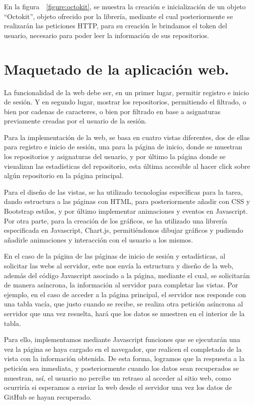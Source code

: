 En la figura~~\ref{figure:octokit}, se muestra la creación e inicialización de un objeto “Octokit”, objeto ofrecido por la librería, mediante el cual posteriormente se realizarán las peticiones HTTP, para su creación le brindamos el token del usuario, necesario para poder leer la información de sus repositorios. 



\section{Maquetado de la aplicación web.}

La funcionalidad de la web debe ser, en un primer lugar, permitir registro e inicio de sesión. Y en segundo lugar, mostrar los repositorios, permitiendo el filtrado, o bien por cadenas de caracteres, o bien por filtrado en base a asignaturas previamente creadas por el usuario de la sesión.

Para la implementación de la web, se basa en cuatro vistas diferentes, dos de ellas para registro e inicio de sesión, una para la página de inicio, donde se muestran los repositorios y asignaturas del usuario, y por último la página donde se visualizan las estadísticas del repositorio, esta última accesible al hacer click sobre algún repositorio en la página principal.

Para el diseño de las vistas, se ha utilizado tecnologías específicas para la tarea, dando estructura a las páginas con HTML, para posteriormente añadir con CSS\cite{GradienteCSS} y Bootstrap\cite{Bootstrap} estilos, y por último implementar animaciones y eventos en Javascript. Por otra parte, para la creación de los gráficos, se ha utilizado una librería especificada en Javascript, Chart.js\cite{ChartJS,ChartJSIntro}, permitiéndonos dibujar gráficos y pudiendo añadirle animaciones y interacción con el usuario a los mismos.

En el caso de la página de las páginas de inicio de sesión y estadísticas, al solicitar las webs al servidor, este nos envía la estructura y diseño de la web, además del código Javascript asociado a la página,  mediante el cual, se solicitarán de manera asíncrona, la información al servidor para completar las vistas. Por ejemplo, en el caso de acceder a la página principal, el servidor nos responde con una tabla vacía, que justo cuando se recibe, se realiza otra petición asíncrona al servidor que una vez resuelta, hará que los datos se muestren en el interior de la tabla. 

Para ello, implementamos mediante Javascript funciones que se ejecutarán una vez la página se haya cargado en el navegador, que realicen el completado de la vista con la información obtenida. De esta forma, logramos que la respuesta a la petición sea inmediata, y posteriormente cuando los datos sean recuperados se muestran, así, el usuario no percibe un retraso al acceder al sitio web, como ocurriría si esperamos a enviar la web desde el servidor una vez los datos de GitHub se hayan recuperado.


